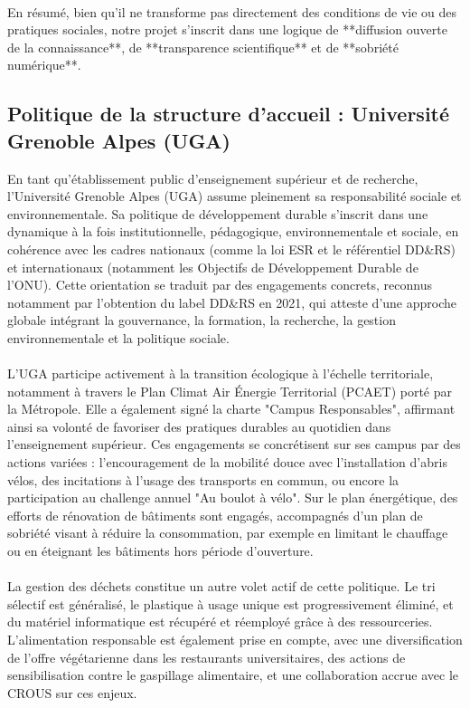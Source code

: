 \documentclass[12pt]{article}
\begin{document}
\\
En résumé, bien qu’il ne transforme pas directement des conditions de vie ou des pratiques sociales, notre projet s’inscrit dans une logique de **diffusion ouverte de la connaissance**, de **transparence scientifique** et de **sobriété numérique**. 

\subsection{Politique de la structure d'accueil : Université Grenoble Alpes (UGA)}
En tant qu’établissement public d’enseignement supérieur et de recherche, l’Université Grenoble Alpes (UGA) assume pleinement sa responsabilité sociale et environnementale. Sa politique de développement durable s’inscrit dans une dynamique à la fois institutionnelle, pédagogique, environnementale et sociale, en cohérence avec les cadres nationaux (comme la loi ESR et le référentiel DD\&RS) et internationaux (notamment les Objectifs de Développement Durable de l’ONU). Cette orientation se traduit par des engagements concrets, reconnus notamment par l’obtention du label DD\&RS en 2021, qui atteste d’une approche globale intégrant la gouvernance, la formation, la recherche, la gestion environnementale et la politique sociale.\\
\\
L’UGA participe activement à la transition écologique à l’échelle territoriale, notamment à travers le Plan Climat Air Énergie Territorial (PCAET) porté par la Métropole. Elle a également signé la charte "Campus Responsables", affirmant ainsi sa volonté de favoriser des pratiques durables au quotidien dans l’enseignement supérieur. Ces engagements se concrétisent sur ses campus par des actions variées : l’encouragement de la mobilité douce avec l’installation d’abris vélos, des incitations à l’usage des transports en commun, ou encore la participation au challenge annuel "Au boulot à vélo". Sur le plan énergétique, des efforts de rénovation de bâtiments sont engagés, accompagnés d’un plan de sobriété visant à réduire la consommation, par exemple en limitant le chauffage ou en éteignant les bâtiments hors période d’ouverture.\\
\\
La gestion des déchets constitue un autre volet actif de cette politique. Le tri sélectif est généralisé, le plastique à usage unique est progressivement éliminé, et du matériel informatique est récupéré et réemployé grâce à des ressourceries. L’alimentation responsable est également prise en compte, avec une diversification de l’offre végétarienne dans les restaurants universitaires, des actions de sensibilisation contre le gaspillage alimentaire, et une collaboration accrue avec le CROUS sur ces enjeux.\\
\end{document}
